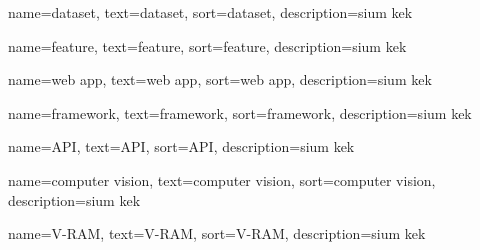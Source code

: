  {
    name=dataset,
    text=dataset,
    sort=dataset,
    description={sium kek}
}

 {
    name=feature,
    text=feature,
    sort=feature,
    description={sium kek}
}

 {
    name=web app,
    text=web app,
    sort=web app,
    description={sium kek}
}

 {
    name=framework,
    text=framework,
    sort=framework,
    description={sium kek}
}

 {
    name=API,
    text=API,
    sort=API,
    description={sium kek}
}

 {
    name=computer vision,
    text=computer vision,
    sort=computer vision,
    description={sium kek}
}

 {
    name=V-RAM,
    text=V-RAM,
    sort=V-RAM,
    description={sium kek}
}

